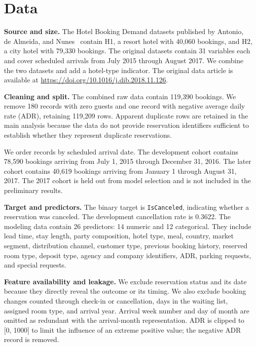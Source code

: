 \documentclass{article}
\begin{document}
\section{Data}

\textbf{Source and size.}
The Hotel Booking Demand datasets published by Antonio, de Almeida,
and Nunes~\cite{antonio2019hotel} contain H1, a resort hotel with
40,060 bookings, and H2, a city hotel with 79,330 bookings. The
original datasets contain 31 variables each and cover scheduled
arrivals from July 2015 through August 2017. We combine the two
datasets and add a hotel-type indicator. The original data article
is available at
\url{https://doi.org/10.1016/j.dib.2018.11.126}.

\textbf{Cleaning and split.}
The combined raw data contain 119,390 bookings. We remove 180
records with zero guests and one record with negative average daily
rate (ADR), retaining 119,209 rows. Apparent duplicate rows are
retained in the main analysis because the data do not provide
reservation identifiers sufficient to establish whether they
represent duplicate reservations.

We order records by scheduled arrival date. The development cohort
contains 78,590 bookings arriving from July 1, 2015 through
December 31, 2016. The later cohort contains 40,619 bookings arriving
from January 1 through August 31, 2017. The 2017 cohort is held out
from model selection and is not included in the preliminary results.

\textbf{Target and predictors.}
The binary target is \texttt{IsCanceled}, indicating whether a
reservation was canceled. The development cancellation rate is
0.3622. The modeling data contain 26 predictors: 14 numeric and
12 categorical. They include lead time, stay length, party
composition, hotel type, meal, country, market segment, distribution
channel, customer type, previous booking history, reserved room
type, deposit type, agency and company identifiers, ADR, parking
requests, and special requests.

\textbf{Feature availability and leakage.}
We exclude reservation status and its date because they directly
reveal the outcome or its timing. We also exclude booking changes
counted through check-in or cancellation, days in the waiting list,
assigned room type, and arrival year. Arrival week number and day
of month are omitted as redundant with the arrival-month
representation. ADR is clipped to [0, 1000] to limit the influence
of an extreme positive value; the negative ADR record is removed.
\end{document}
